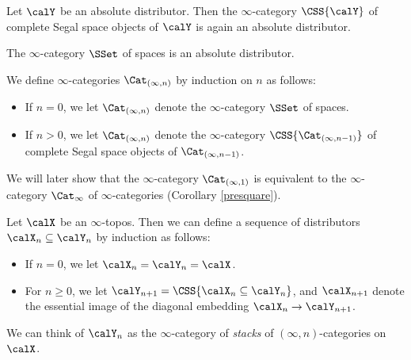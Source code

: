 
\begin{corollary}\label{cus1}
Let $\calY$ be an absolute distributor. Then the $\infty$-category $\CSS{ \calY}$ of complete Segal space objects of $\calY$ is again an absolute distributor.
\end{corollary}

\begin{example}\label{cus2}
The $\infty$-category $\SSet$ of spaces is an absolute distributor.
\end{example}

\begin{definition}
We define $\infty$-categories $\Cat_{(\infty, n)}$ by induction on $n$ as follows:
\begin{itemize}
\item If $n =0$, we let $\Cat_{(\infty, n)}$ denote the $\infty$-category $\SSet$ of spaces.
\item If $n > 0$, we let $\Cat_{(\infty, n)}$ denote the $\infty$-category
$\CSS{ \Cat_{ (\infty, n-1)}}$ of complete Segal space objects of $\Cat_{ (\infty, n-1)}$. 
\end{itemize}
\end{definition}

\begin{remark}
We will later show that the $\infty$-category $\Cat_{( \infty, 1)}$ is equivalent to the $\infty$-category
$\Cat_{\infty}$ of $\infty$-categories (Corollary \ref{presquare}).
\end{remark}

\begin{variant}
Let $\calX$ be an $\infty$-topos. Then we can define a sequence of distributors
$\calX_n \subseteq \calY_n$ by induction as follows:
\begin{itemize}
\item If $n=0$, we let $\calX_n = \calY_n = \calX$.
\item For $n \geq 0$, we let $\calY_{n+1} = \CSS{ \calX_{n} \subseteq \calY_n }$, and
$\calX_{n+1}$ denote the essential image of the diagonal embedding $\calX_{n} \rightarrow
\calY_{n+1}$.  
\end{itemize}
We can think of $\calY_{n}$ as the $\infty$-category of {\em stacks} of $(\infty,n)$-categories
on $\calX$.
\end{variant}

